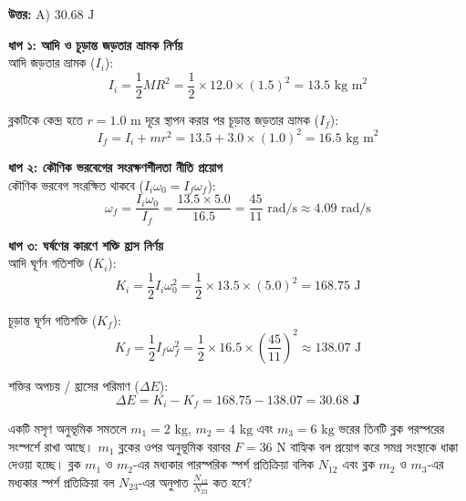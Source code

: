\documentclass[12pt, a4paper]{article}
\begin{document}
{\begin{tcolorbox}[answerbox]
\textbf{\color{success} উত্তর:} A) $30.68\text{ J}$
\end{tcolorbox}
\vspace{1em}

\begin{tcolorbox}[solutionbox={সমাধান (Solution)}]
\noindent
\textbf{ধাপ ১: আদি ও চূড়ান্ত জড়তার ভ্রামক নির্ণয়} \\
আদি জড়তার ভ্রামক ($I_i$):
\[I_i = \frac{1}{2} M R^2 = \frac{1}{2} \times 12.0 \times (1.5)^2 = 13.5\text{ kg m}^2\]

ব্লকটিকে কেন্দ্র হতে $r = 1.0\text{ m}$ দূরে স্থাপন করার পর চূড়ান্ত জড়তার ভ্রামক ($I_f$):
\[I_f = I_i + m r^2 = 13.5 + 3.0 \times (1.0)^2 = 16.5\text{ kg m}^2\]

\vspace{0.5em}
\noindent\textbf{ধাপ ২: কৌণিক ভরবেগের সংরক্ষণশীলতা নীতি প্রয়োগ} \\
কৌণিক ভরবেগ সংরক্ষিত থাকবে ($I_i \omega_0 = I_f \omega_f$):
\[\omega_f = \frac{I_i \omega_0}{I_f} = \frac{13.5 \times 5.0}{16.5} = \frac{45}{11}\text{ rad/s} \approx 4.09\text{ rad/s}\]

\vspace{0.5em}
\noindent\textbf{ধাপ ৩: ঘর্ষণের কারণে শক্তি হ্রাস নির্ণয়} \\
আদি ঘূর্ণন গতিশক্তি ($K_i$):
\[K_i = \frac{1}{2} I_i \omega_0^2 = \frac{1}{2} \times 13.5 \times (5.0)^2 = 168.75\text{ J}\]

চূড়ান্ত ঘূর্ণন গতিশক্তি ($K_f$):
\[K_f = \frac{1}{2} I_f \omega_f^2 = \frac{1}{2} \times 16.5 \times \left(\frac{45}{11}\right)^2 \approx 138.07\text{ J}\]

শক্তির অপচয় / হ্রাসের পরিমাণ ($\Delta E$):
\[\Delta E = K_i - K_f = 168.75 - 138.07 = \mathbf{30.68\text{ J}}\]
\end{tcolorbox}
\begin{tcolorbox}[questionbox={প্রশ্ন (Question) 20}]
\noindent
একটি মসৃণ অনুভূমিক সমতলে $m_1 = 2\text{ kg}$, $m_2 = 4\text{ kg}$ এবং $m_3 = 6\text{ kg}$ ভরের তিনটি ব্লক পরস্পরের সংস্পর্শে রাখা আছে। $m_1$ ব্লকের ওপর অনুভূমিক বরাবর $F = 36\text{ N}$ বাহ্যিক বল প্রয়োগ করে সমগ্র সংস্থাকে ধাক্কা দেওয়া হচ্ছে। ব্লক $m_1$ ও $m_2$-এর মধ্যকার পারস্পরিক স্পর্শ প্রতিক্রিয়া বলিক $N_{12}$ এবং ব্লক $m_2$ ও $m_3$-এর মধ্যকার স্পর্শ প্রতিক্রিয়া বল $N_{23}$-এর অনুপাত $\frac{N_{12}}{N_{23}}$ কত হবে?


\end{tcolorbox}}
\end{document}
